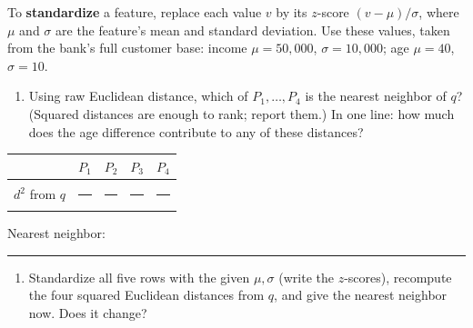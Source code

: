 \documentclass[
  11pt,
]{article}
\newcounter{none} %
\providecommand{\tightlist}{%
  \setlength{\itemsep}{0pt}\setlength{\parskip}{0pt}}
\newcommand{\answerspace}[1]{\par\vspace*{#1}}  %
\newcommand{\blank}[1][1.2in]{\rule{#1}{0.4pt}}
\begin{document}
To \textbf{standardize} a feature, replace each value \(v\) by its
\(z\)-score \((v-\mu)/\sigma\), where \(\mu\) and \(\sigma\) are the
feature's mean and standard deviation. Use these values, taken from the
bank's full customer base: income \(\mu = 50{,}000\),
\(\sigma = 10{,}000\); age \(\mu = 40\), \(\sigma = 10\).

\begin{enumerate}
\def\labelenumi{(\alph{enumi})}
\tightlist
\item
  Using raw Euclidean distance, which of \(P_1,\dots,P_4\) is the
  nearest neighbor of \(q\)? (Squared distances are enough to rank;
  report them.) In one line: how much does the age difference contribute
  to any of these distances?
\end{enumerate}

{\def\LTcaptype{none} %
\begin{longtable}[]{@{}
  >{\centering\arraybackslash}p{}
  >{\centering\arraybackslash}p{}
  >{\centering\arraybackslash}p{}
  >{\centering\arraybackslash}p{}
  >{\centering\arraybackslash}p{}@{}}
\toprule\noalign{}
\begin{minipage}[b]{\linewidth}\centering
\end{minipage} & \begin{minipage}[b]{\linewidth}\centering
\(P_1\)
\end{minipage} & \begin{minipage}[b]{\linewidth}\centering
\(P_2\)
\end{minipage} & \begin{minipage}[b]{\linewidth}\centering
\(P_3\)
\end{minipage} & \begin{minipage}[b]{\linewidth}\centering
\(P_4\)
\end{minipage} \\
\midrule\noalign{}
\endhead
\bottomrule\noalign{}
\endlastfoot
\(d^2\) from \(q\) & \blank[0.9in] & \blank[0.9in] & \blank[0.9in] &
\blank[0.9in] \\
\end{longtable}
}

Nearest neighbor: \blank[0.7in]

\answerspace{1.4in}

\begin{enumerate}
\def\labelenumi{(\alph{enumi})}
\setcounter{enumi}{1}
\tightlist
\item
  Standardize all five rows with the given \(\mu,\sigma\) (write the
  \(z\)-scores), recompute the four squared Euclidean distances from
  \(q\), and give the nearest neighbor now. Does it change?
\end{enumerate}
\end{document}

